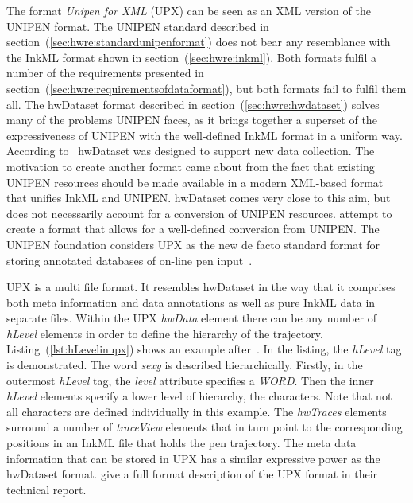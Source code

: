 The format \emph{Unipen for XML} (UPX) can be seen as an XML version of the
UNIPEN format. The UNIPEN standard described in 
section~(\ref{sec:hwre:standardunipenformat}) does not bear any resemblance
with the InkML format shown in section~(\ref{sec:hwre:inkml}).
Both formats fulfil a number of the requirements presented in 
section~(\ref{sec:hwre:requirementsofdataformat}), but both formats fail to 
fulfil them all. The hwDataset format described in 
section~(\ref{sec:hwre:hwdataset}) solves many of the problems UNIPEN faces,
as it brings together a superset of the expressiveness of UNIPEN with
the well-defined InkML format in a uniform way.
According to~ \citeyear{Agrawal2005} hwDataset
was designed to support new data collection. The motivation to create another
format came about from the fact that existing UNIPEN resources should be made
available in a modern XML-based format that unifies InkML and UNIPEN.
hwDataset comes very close to this aim, but does not necessarily account for a 
conversion of UNIPEN resources.  \citeyear{Agrawal2005}
attempt to create a format that allows for a well-defined conversion from UNIPEN.
The UNIPEN foundation considers UPX as the new de facto standard format for 
storing annotated databases of on-line pen input~.

UPX is a multi file format. It resembles hwDataset in the way that it comprises 
both meta information and data annotations as well as pure InkML data in 
separate files. Within the UPX \emph{hwData} element there can be any number
of \emph{hLevel} elements in order to define the hierarchy of the trajectory.
Listing~(\ref{lst:hLevelinupx}) shows an example 
after~. In the listing, the \emph{hLevel} tag
is demonstrated. The word \emph{sexy} is described hierarchically.
Firstly, in the outermost \emph{hLevel} tag, the \emph{level} attribute specifies
a \emph{WORD}. Then the inner \emph{hLevel} elements specify a lower level
of hierarchy, the characters. Note that not all characters are defined
individually in this example.
The \emph{hwTraces} elements surround a number of \emph{traceView} elements that
in turn point to the corresponding positions in an InkML file that holds the 
pen trajectory. The meta data information that can be stored in UPX has a 
similar expressive power as the hwDataset format.
 \citeyear{Madhvanath2006} give a full format 
description of the UPX format in their technical report.

